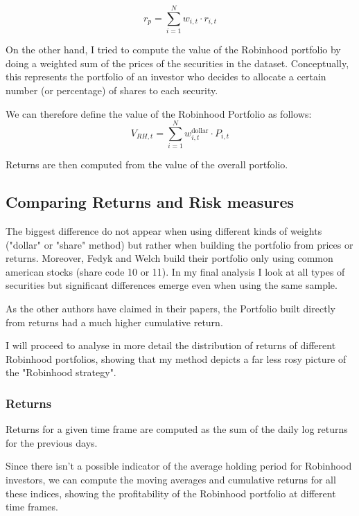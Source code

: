 \begin{equation}
    r_p = \sum_{i=1}^N w_{i,t}\cdot r_{i,t}
\end{equation}

On the other hand, I tried to compute the value of the Robinhood portfolio by doing a weighted sum of the prices of the securities in the dataset.
Conceptually, this represents the portfolio of an investor who decides to allocate a certain number (or percentage) of shares to each security.  

We can therefore define the value of the Robinhood Portfolio as follows:
\begin{equation*}
    V_{RH,t}=\sum_{i=1}^N w^{\text{dollar}}_{i,t}\cdot P_{i,t}
\end{equation*}

Returns are then computed from the value of the overall portfolio. 

\subsection{Comparing Returns and Risk measures}
The biggest difference do not appear when using different kinds of weights ("dollar" or "share" method) but rather when building the portfolio from prices or returns. 
Moreover, Fedyk and Welch build their portfolio only using common american stocks (share code 10 or 11). 
In my final analysis I look at all types of securities but significant differences emerge even when using the same sample. 

As the other authors have claimed in their papers, the Portfolio built directly from returns had a much higher cumulative return.

I will proceed to analyse in more detail the distribution of returns of different Robinhood portfolios, showing that my method depicts a far less rosy picture of the "Robinhood strategy".

\subsubsection{Returns}

Returns for a given time frame are computed as the sum of the daily log returns for the previous days.

Since there isn't a possible indicator of the average holding period for Robinhood investors, 
we can compute the moving averages and cumulative returns for all these indices, showing the profitability of the Robinhood portfolio at different time frames.

